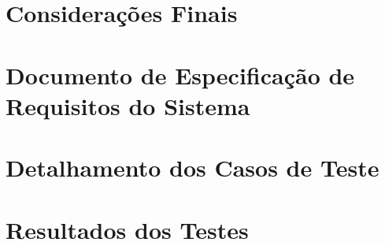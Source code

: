 \documentclass[tcc,baec,oneside]{unipampa}
\begin{document}
\chapter{Considerações Finais}
\label{cap-consideracoesFinais}


%
%




\appendix
\chapter{Documento de Especificação de Requisitos do Sistema}
\label{appendix-requisitos}


\chapter{Detalhamento dos Casos de Teste}
\label{appendix-casosTeste}


\chapter{Resultados dos Testes}
\label{appendix-resultadosTestes}




\annex


%
%
\end{document}
